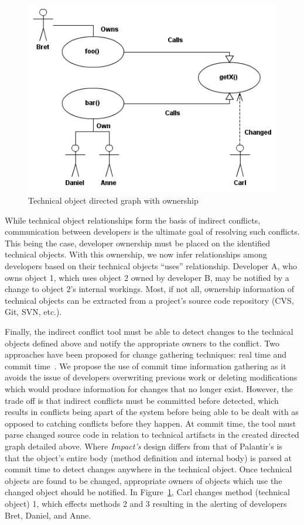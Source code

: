\documentclass[conference]{IEEEtran}
\begin{document}
\begin{figure}[t!]
\includegraphics[width=\columnwidth]{images/CallGraph}
\caption{Technical object directed graph with ownership\label{fig:graph}}
\end{figure}

While technical object relationships form the basis of indirect conflicts,
communication between developers is the ultimate goal of resolving such conflicts.
This being the case, developer ownership must be placed on the 
identified technical objects. With this ownership, we now infer
relationships among developers based on their technical objects
``uses'' relationship. Developer A, who owns object 1, which uses 
object 2 owned by developer B, may be notified by a change to
object 2's internal workings. Most, if not all, ownership information
of technical objects can be extracted from a project's source code
repository (CVS, Git, SVN, etc.).

Finally, the indirect conflict tool must be able to detect changes
to the technical objects defined above and notify the appropriate owners
to the conflict. 
Two approaches have been 
proposed for change gathering techniques: real time and commit 
time~\cite{Fitzpatrick:2002:SPA}.
We propose the use of commit time
information gathering as it avoids the issue of developers 
overwriting previous work or deleting modifications which would 
produce information for changes that no longer exist. However, the
trade off is that indirect conflicts must be committed before detected,
which results in conflicts being apart of the system before being able
to be dealt with as opposed to catching conflicts before they happen.
At commit time, the tool must parse changed source code in relation
to technical artifacts in the created directed graph detailed above.
Where \textit{Impact's} design differs from that of Palantir's is that
the object's entire body (method definition and internal body) is 
parsed at commit time to detect changes anywhere in the technical object.
Once technical objects are found to be changed, appropriate owners
of objects which use the changed object should be notified.
In Figure~\ref{fig:graph}, Carl changes method (technical object) 1,
which effects methods 2 and 3 resulting in the alerting of
developers Bret, Daniel, and Anne.
\end{document}
